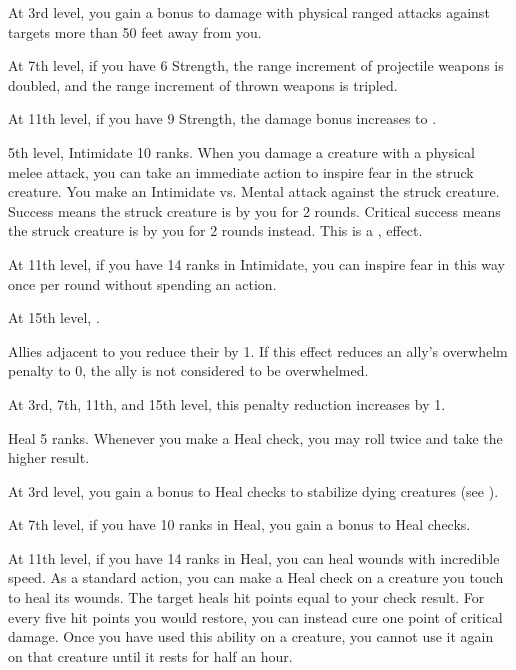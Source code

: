    At 3rd level, you gain a  bonus to damage with physical ranged attacks against targets more than 50 feet away from you.

    At 7th level, if you have 6 Strength, the range increment of projectile weapons is doubled, and the range increment of thrown weapons is tripled.

    At 11th level, if you have 9 Strength, the damage bonus increases to .

    \featpres 5th level, Intimidate 10 ranks.
    \featben When you damage a creature with a physical melee attack, you can take an immediate action to inspire fear in the struck creature.
    You make an Intimidate vs. Mental attack against the struck creature.
    Success means the struck creature is \shaken by you for 2 rounds.
    Critical success means the struck creature is \frightened by you for 2 rounds instead.
    This is a ,  effect.

    At 11th level, if you have 14 ranks in Intimidate, you can inspire fear in this way once per round without spending an action.

    At 15th level, \tdash.

    \featben Allies adjacent to you reduce their  by 1.
    If this effect reduces an ally's overwhelm penalty to 0, the ally is not considered to be overwhelmed.

    At 3rd, 7th, 11th, and 15th level, this penalty reduction increases by 1.

    \featpre Heal 5 ranks.
    \featben Whenever you make a Heal check, you may roll twice and take the higher result.

    At 3rd level, you gain a  bonus to Heal checks to stabilize dying creatures (see ).

    At 7th level, if you have 10 ranks in Heal, you gain a  bonus to Heal checks.

    At 11th level, if you have 14 ranks in Heal, you can heal wounds with incredible speed.
    As a standard action, you can make a Heal check on a creature you touch to heal its wounds.
    The target heals hit points equal to your check result.
    For every five hit points you would restore, you can instead cure one point of critical damage.
    Once you have used this ability on a creature, you cannot use it again on that creature until it rests for half an hour.

